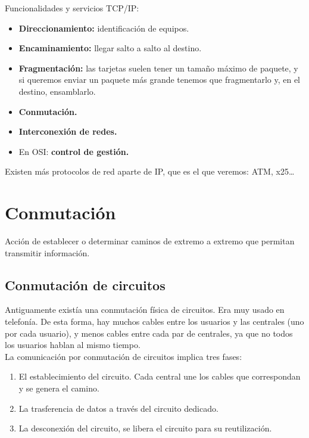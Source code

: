 Funcionalidades y servicios TCP\@/IP\@:
\begin{itemize}
    \item \textbf{Direccionamiento:} identificación de equipos.
    \item \textbf{Encaminamiento:} llegar salto a salto al destino. 
    \item \textbf{Fragmentación:} las tarjetas suelen tener un tamaño máximo de paquete, y si queremos enviar un paquete más grande tenemos que fragmentarlo y, en el destino, ensamblarlo. 
    \item \textbf{Conmutación.} 
    \item \textbf{Interconexión de redes.}
    \item En OSI\@: \textbf{control de gestión.}
\end{itemize} 

Existen más protocolos de red aparte de \acrshort{IP}\@, que es el que veremos: \acrshort{ATM}\@, x25\ldots

\section{Conmutación}

\begin{definicion}[Conmutación]
    Acción de establecer o determinar caminos de extremo a extremo que permitan transmitir información.         
\end{definicion}

\subsection{Conmutación de circuitos}

Antiguamente existía una conmutación física de circuitos. Era muy usado en telefonía. De esta forma, hay muchos cables entre los usuarios y las centrales (uno por cada usuario), y menos cables entre cada par de centrales, ya que no todos los usuarios hablan al mismo tiempo. \\

La comunicación por conmutación de circuitos implica tres fases:
\begin{enumerate}
    \item El establecimiento del circuito. Cada central une los cables que correspondan y se genera el camino. 
    \item La trasferencia de datos a través del circuito dedicado.
    \item La desconexión del circuito, se libera el circuito para su reutilización.
\end{enumerate}

